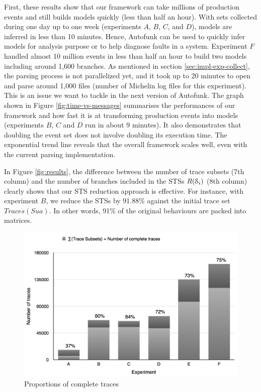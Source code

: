 First, these results show that our framework can take millions
of production events and still builds models quickly (less than
half an hour). With sets collected during one day up to one
week (experiments $A$, $B$, $C$, and $D$), models are inferred in
less than 10 minutes. Hence, Autofunk can be used to
quickly infer models for analysis purpose or to help diagnose
faults in a system. Experiment $F$ handled almost 10 million
events in less
than half an hour to build two models including around 1,600
branches. As mentioned in section \ref{sec:impl-exp-collect},
the parsing process is not parallelized yet, and it took up to 20
minutes to open and parse around 1,000 files (number of Michelin
log files for this experiment). This is an issue we want to
tackle in the next version of Autofunk. The graph shown
in Figure \ref{fig:time-vs-messages} summarises the performances
of our framework and how fast it is at transforming production
events into models (experiments $B$, $C$ and $D$ run in about 9
minutes). It also demonstrates that doubling the event
set does not involve doubling its execution time. The exponential
trend line reveals that the overall framework scales well, even
with the current parsing implementation.

In Figure \ref{fig:results}, the difference between the number of
trace subsets (7th column) and the number of branches included in
the STSs $R(\EuScript{S}_i)$ (8th column) clearly shows that our
STS reduction approach is effective. For instance, with
experiment $B$, we reduce the STSs by 91.88\% against the initial
trace set $Traces(Sua)$. In other words, 91\% of the original
behaviours are packed into matrices.

\begin{figure}[ht]
  \includegraphics[width=0.9\linewidth]{figures/proportions.png}

  \caption{Proportions of complete traces}
  \label{fig:proportions}
\end{figure}

